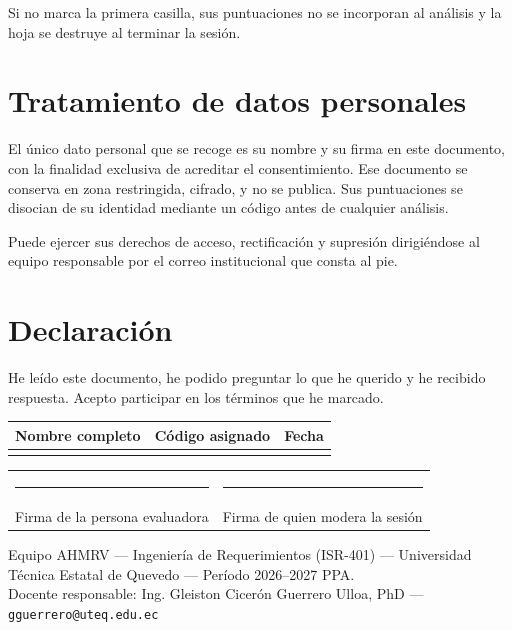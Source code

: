 \documentclass[11pt,a4paper]{article}
\begin{document}
\vspace{4pt}
{\footnotesize Si no marca la primera casilla, sus puntuaciones no se incorporan
al análisis y la hoja se destruye al terminar la sesión.}

\section{Tratamiento de datos personales}

El único dato personal que se recoge es su nombre y su firma en este documento,
con la finalidad exclusiva de acreditar el consentimiento. Ese documento se
conserva en zona restringida, cifrado, y no se publica. Sus puntuaciones se
disocian de su identidad mediante un código antes de cualquier análisis.

Puede ejercer sus derechos de acceso, rectificación y supresión dirigiéndose al
equipo responsable por el correo institucional que consta al pie.

\section{Declaración}

He leído este documento, he podido preguntar lo que he querido y he recibido
respuesta. Acepto participar en los términos que he marcado.

\vspace{6pt}
\renewcommand{\arraystretch}{1.4}
\begin{tabular}{L{5.5cm} L{5.2cm} L{5cm}}
\toprule
{}
\textbf{Nombre completo} & \textbf{Código asignado} & \textbf{Fecha} \\
\midrule
\rule{0pt}{4.5ex} & & \\
\bottomrule
\end{tabular}

\vspace{20pt}

\begin{center}
\begin{tabular}{C{7cm} C{7cm}}
\rule{6.2cm}{0.4pt} & \rule{6.2cm}{0.4pt} \\
{\footnotesize Firma de la persona evaluadora} &
{\footnotesize Firma de quien modera la sesión} \\
\end{tabular}
\end{center}

\vfill
{\footnotesize
Equipo AHMRV --- Ingeniería de Requerimientos (ISR-401) --- Universidad Técnica
Estatal de Quevedo --- Período 2026--2027 PPA.\\
Docente responsable: Ing. Gleiston Cicerón Guerrero Ulloa, PhD ---
\texttt{gguerrero@uteq.edu.ec}}
\end{document}
